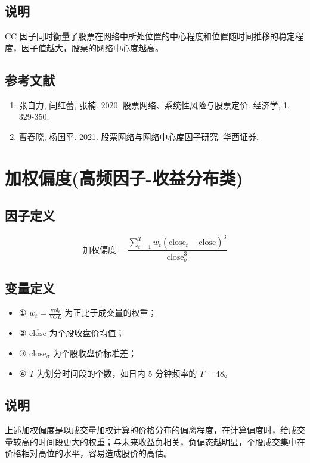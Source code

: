 \documentclass{article}
\begin{document}
\subsection{说明}
\( \mathrm{CC} \) 因子同时衡量了股票在网络中所处位置的中心程度和位置随时间推移的稳定程度，因子值越大，股票的网络中心度越高。

\subsection{参考文献}
\begin{enumerate}
    \item 张自力, 闫红蕾, 张楠. 2020. 股票网络、系统性风险与股票定价. 经济学, 1, 329-350.
    \item 曹春晓, 杨国平. 2021. 股票网络与网络中心度因子研究. 华西证券.
\end{enumerate}

\section{加权偏度(高频因子-收益分布类)}

\subsection{因子定义}
\begin{equation}
    \text{加权偏度} = \frac{ \sum_{t=1}^T w_t (\mathrm{close}_t - \overline{\mathrm{close}})^3}{\mathrm{close}_{\sigma}^3}
\end{equation}

\subsection{变量定义}
\begin{itemize}
    \item ① \( w_t = \frac{\mathrm{vol}_t}{VOL} \) 为正比于成交量的权重；
    \item ② \( \overline{\mathrm{close}} \) 为个股收盘价均值；
    \item ③ \( \mathrm{close}_{\sigma} \) 为个股收盘价标准差；
    \item ④ \( T \) 为划分时间段的个数，如日内 5 分钟频率的 \( T=48 \)。
\end{itemize}

\subsection{说明}
上述加权偏度是以成交量加权计算的价格分布的偏离程度，在计算偏度时，给成交量较高的时间段更大的权重；与未来收益负相关，负偏态越明显，个股成交集中在价格相对高位的水平，容易造成股价的高估。
\end{document}
